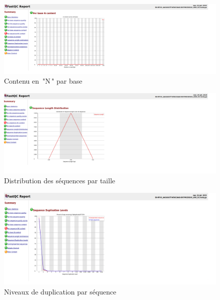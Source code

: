 \documentclass[a4paper,11pt]{article}
\begin{document}
\begin{figure}
  \begin{center}
    \includegraphics[width=16cm]{Images/FastqcMetrics6_Sample1_R1}
  \end{center}
  \caption{Contenu en \,"N\," par base}
  \label{fig-FastqcMetrics1_Sample6_R1}
\end{figure}

\begin{figure}
  \begin{center}
    \includegraphics[width=16cm]{Images/FastqcMetrics7_Sample1_R1}
  \end{center}
  \caption{Distribution des séquences par taille}
  \label{fig-FastqcMetrics1_Sample7_R1}
\end{figure}

\begin{figure}
  \begin{center}
    \includegraphics[width=16cm]{Images/FastqcMetrics8_Sample1_R1}
  \end{center}
  \caption{Niveaux de duplication par séquence}
  \label{fig-FastqcMetrics1_Sample8_R1}
\end{figure}
\end{document}
